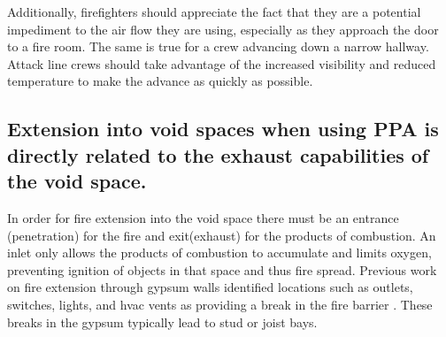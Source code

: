 \documentclass{article}
\begin{document}
Additionally, firefighters should appreciate the fact that they are a potential impediment to the air flow they are using, especially as they approach the door to a fire room. The same is true for a crew advancing down a narrow hallway. Attack line crews should take advantage of the increased visibility and reduced temperature to make the advance as quickly as possible.

\subsection{Extension into void spaces when using PPA is directly related to the exhaust capabilities of the void space.} \label{TC:Extension_Into_Voids}
In order for fire extension into the void space there must be an entrance (penetration) for the fire and exit(exhaust) for the products of combustion. An inlet only allows the products of combustion to accumulate and limits oxygen, preventing ignition of objects in that space and thus fire spread. Previous work on fire extension through gypsum walls identified locations such as outlets, switches, lights, and hvac vents as providing a break in the fire barrier\cite{DHS2011} \cite{WeinschenkStrongVentFlowFires}.  These breaks in the gypsum typically lead to stud or joist bays. 
\end{document}
